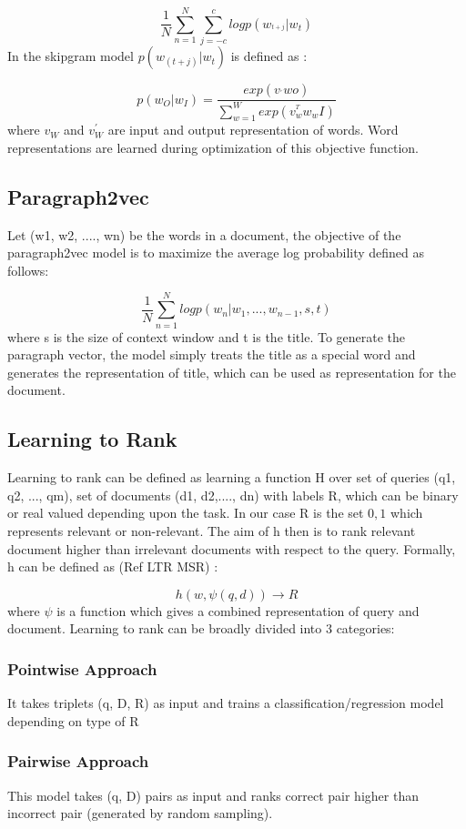 \documentclass[runningheads,a4paper]{llncs}
\begin{document}
$$ \frac{1}{N} \sum_{n=1}^{N} \sum_{j=-c}^{c} log p(w_^{t+j} | w_t) $$
In the skipgram model $p(w_(t+j)|w_t)$ is defined as :

$$ p(w_O | w_I) = \frac{exp(v_^'wo)}{\sum_{w=1}^{W} exp(v_w^^T w_wI)} $$ 
where $v_W$ and $v_W^'$ are input and output representation of words. Word representations are learned during optimization of this objective function.

\subsection{Paragraph2vec}
Let (w1, w2, ...., wn) be the words in a document, the objective of the paragraph2vec model is to maximize the average log probability defined as follows:

$$ \frac{1}{N} \sum_{n=1}^{N} log p(w_n | w_1,..., w_{n-1}, s, t) $$
where s is the size of context window and t is the title. To generate the paragraph vector, the model simply treats the title as a special word and generates the representation of title, which can be used as representation for the document.

\subsection{Learning to Rank}
Learning to rank can be defined as learning a function H over set of queries (q1, q2, ..., qm), set of documents (d1, d2,...., dn) with labels R, which can be binary or real valued depending upon the task. In our case R is the set ${0,1}$ which represents relevant or non-relevant. The aim of h then is to rank relevant document higher than irrelevant documents with respect to the query. Formally, h can be defined as (Ref LTR MSR) :

$$ h(w, \psi(q, d)) \rightarrow R $$ 
where $\psi$ is a function which gives a combined representation of query and document. Learning to rank can be broadly divided into 3 categories:

\subsubsection{Pointwise Approach} 
It takes triplets (q, D, R) as input and trains a classification/regression model depending on type of R

\subsubsection{Pairwise Approach}
This model takes (q, D) pairs as input and ranks correct pair higher than incorrect pair (generated by random sampling). 
\end{document}

